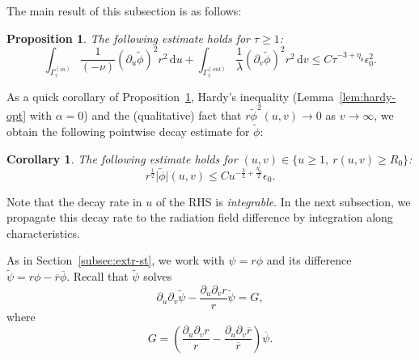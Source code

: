 \documentclass[10pt, reqno]{amsart}
\newtheorem{corollary}[theorem]{Corollary}
\newtheorem{proposition}[theorem]{Proposition}
\theoremstyle{definition}
\theoremstyle{remark}
\theoremstyle{conjecture}
\numberwithin{equation}{section}
\newcommand{\abs}[1]{\vert#1\vert}
\newcommand{\set}[1]{\{#1\}}
\newcommand{\ud}{\mathrm{d}}
\newcommand{\rd}{\partial}
\newcommand{\0}{\emptyset}
\newcommand{\alp}{\alpha}
\newcommand{\Gmm}{\Gamma}
\newcommand{\eps}{\epsilon}
\newcommand{\lmb}{\lambda}
\newcommand{\dur}{\nu}
\newcommand{\dvr}{\lmb}
\newcommand{\phibg}{\overline{\phi}}				%
\newcommand{\psibg}{\overline{\psi}}				%
\newcommand{\rbg}{\overline{r}}					%
\newcommand{\phidf}{\widetilde{\phi}}				%
\newcommand{\psidf}{\widetilde{\psi}}				%
\begin{document}
The main result of this subsection is as follows:
\begin{proposition} \label{prop:en-decay}
The following estimate holds for $\tau \geq 1$:
\begin{equation} \label{eq:en-decay}
	\int_{\Gmm_{\tau}^{(in)}} \frac{1}{(-\dur)} (\rd_{u} \phidf)^{2} r^{2} \, \ud u
	+ \int_{\Gmm_{\tau}^{(out)}}  \frac{1}{\dvr} (\rd_{v} \phidf)^{2} r^{2} \, \ud v
	\leq C  \tau^{-3 + \eta_{0}} \eps_{0}^{2}.
\end{equation}
\end{proposition} 
As a quick corollary of Proposition~\ref{prop:en-decay}, Hardy's inequality (Lemma~\ref{lem:hardy-opt} with $\alp = 0$) and the (qualitative) fact that $r \phidf^{2}(u, v) \to 0$ as $v \to \infty$, we obtain the following pointwise decay estimate for $\phidf$:
\begin{corollary} \label{cor:phidf-decay-pre}
The following estimate holds for $(u, v) \in \set{u \geq 1, \ r(u, v) \geq R_{0}}$:
\begin{equation} \label{eq:phidf-decay-pre}
	r^{\frac{1}{2}} \abs{\phidf} (u, v) \leq C u^{-\frac{3}{2}+\frac{\eta_{0}}{2}} \eps_{0} .
\end{equation}
\end{corollary}
Note that the decay rate in $u$ of the RHS is \emph{integrable}. In the next subsection, we propagate this decay rate to the radiation field difference by integration along characteristics.

As in Section~\ref{subsec:extr-st}, we work with $\psi = r \phi$ and its difference $\psidf = r \phi - \rbg \phibg$. Recall that $\psidf$ solves
\begin{equation*}
	\rd_{u} \rd_{v} \psidf - \frac{\rd_{u} \rd_{v} r}{r} \psidf = G,
\end{equation*}
where
\begin{equation*}
	G = \left(\frac{\rd_{u} \rd_{v} r}{r} -\frac{\rd_{u} \rd_{v} \rbg}{\rbg} \right) \psibg.
\end{equation*}
\end{document}
